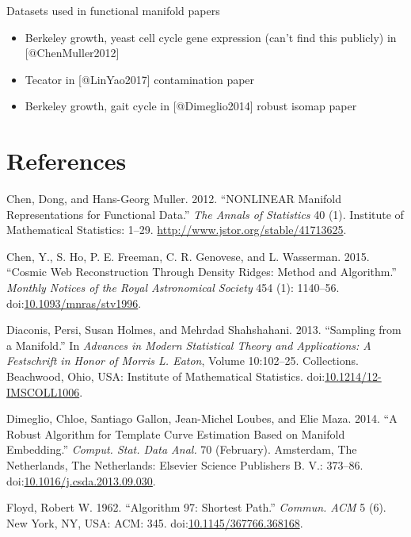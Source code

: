 Datasets used in functional manifold papers

\begin{itemize}
\item Berkeley growth, yeast cell cycle gene expression (can't find this publicly) in [@ChenMuller2012]
\item Tecator in [@LinYao2017] contamination paper
\item Berkeley growth, gait cycle in [@Dimeglio2014] robust isomap paper
\end{itemize}

\section*{References}\label{references}

\hypertarget{refs}{}
\hypertarget{ref-ChenMuller2012}{}
Chen, Dong, and Hans-Georg Muller. 2012. ``NONLINEAR Manifold
Representations for Functional Data.'' \emph{The Annals of Statistics}
40 (1). Institute of Mathematical Statistics: 1--29.
\url{http://www.jstor.org/stable/41713625}.

\hypertarget{ref-ChenHo2015}{}
Chen, Y., S. Ho, P. E. Freeman, C. R. Genovese, and L. Wasserman. 2015.
``Cosmic Web Reconstruction Through Density Ridges: Method and
Algorithm.'' \emph{Monthly Notices of the Royal Astronomical Society}
454 (1): 1140--56.
doi:\href{https://doi.org/10.1093/mnras/stv1996}{10.1093/mnras/stv1996}.

\hypertarget{ref-Diaconis2013}{}
Diaconis, Persi, Susan Holmes, and Mehrdad Shahshahani. 2013. ``Sampling
from a Manifold.'' In \emph{Advances in Modern Statistical Theory and
Applications: A Festschrift in Honor of Morris L. Eaton}, Volume
10:102--25. Collections. Beachwood, Ohio, USA: Institute of Mathematical
Statistics.
doi:\href{https://doi.org/10.1214/12-IMSCOLL1006}{10.1214/12-IMSCOLL1006}.

\hypertarget{ref-Dimeglio2014}{}
Dimeglio, Chloe, Santiago Gallon, Jean-Michel Loubes, and Elie Maza.
2014. ``A Robust Algorithm for Template Curve Estimation Based on
Manifold Embedding.'' \emph{Comput. Stat. Data Anal.} 70 (February).
Amsterdam, The Netherlands, The Netherlands: Elsevier Science Publishers
B. V.: 373--86.
doi:\href{https://doi.org/10.1016/j.csda.2013.09.030}{10.1016/j.csda.2013.09.030}.

\hypertarget{ref-Floyd1962}{}
Floyd, Robert W. 1962. ``Algorithm 97: Shortest Path.'' \emph{Commun.
ACM} 5 (6). New York, NY, USA: ACM: 345.
doi:\href{https://doi.org/10.1145/367766.368168}{10.1145/367766.368168}.

